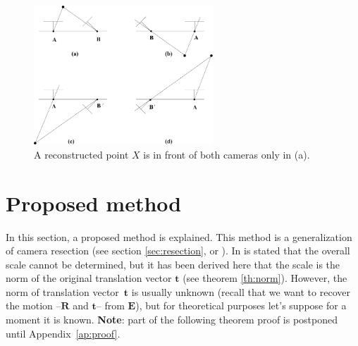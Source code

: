 \begin{figure}[!htbp]
 \centering
 \includegraphics[width=0.6\textwidth]{images/resection.pdf}
 \caption{A reconstructed point $X$ is in front of both cameras only in (a).}
 \label{fig:resection}
\end{figure}
%



\section{Proposed method}

In this section, a proposed method is explained. This method is a generalization of camera resection (see section \ref{sec:resection}, or \cite[Result 9.19]{HZ2}). In \cite[p258, section 9.6.2]{HZ2} is stated that the overall scale cannot be determined,
but it has been derived here that the scale is the norm of the original translation vector $\mathbf{t}$  (see theorem \ref{th:norm}). However, the norm of translation vector~$\mathbf{t}$ is usually unknown (recall that we want to recover the motion --$\mathbf{R}$ and $\mathbf{t}$-- from $\mathbf{E}$), but for theoretical purposes let's suppose for a moment it is known. \textbf{Note}: part of the following theorem proof is postponed until Appendix~\ref{ap:proof}.





